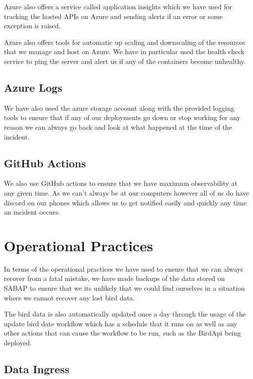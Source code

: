 \documentclass[a4paper]{article}
\begin{document}
Azure also offers a service called application insights which we have used for tracking the hosted APIs on Azure and sending alerts if an error or some exception is raised. 
\newline \newline

Azure also offers tools for automatic up scaling and downscaling of the resources that we manage 
and host on Azure. We have in particular used the health check service to ping the server and 
alert us if any of the containers become unhealthy.

\subsection{Azure Logs}

We have also used the azure storage account along with the provided logging tools to ensure that 
if any of our deployments go down or stop working for any reason we can always go back and 
look at what happened at the time of the incident.

\subsection{GitHub Actions}
We also use GitHub actions to ensure that we have maximum observability at any given time. As 
we can't always be at our computers however all of us do have discord on our phones which 
allows us to get notified easily and quickly any time an incident occurs.

\newpage
\section{Operational Practices}

In terms of the operational practices we have used to ensure that we can always recover from 
a fatal mistake, we have made backups of the data stored on SABAP to ensure that we its 
unlikely that we could find ourselves in a situation where we cannot recover any lost bird data. 
\newline \newline

The bird data is also automatically updated once a day through the usage of the update bird 
date workflow which has a schedule that it runs on as well as any other actions that can 
cause the workflow to be run, such as the BirdApi being deployed.

\subsection{Data Ingress}
\end{document}
